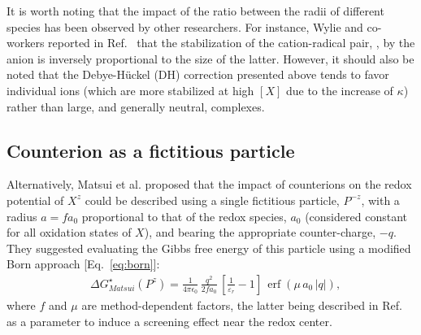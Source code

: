 \documentclass[review,preprint]{elsarticle}
\DeclareMathOperator{\erf}{erf}
\begin{document}
It is worth noting that the impact of the ratio between the radii of different species has been observed by other researchers. For instance, Wylie and co-workers reported in Ref.~ that the stabilization of the cation-radical pair, , by the anion is inversely proportional to the size of the latter. However, it should also be noted that the Debye-Hückel (DH) correction presented above tends to favor individual ions (which are more stabilized at high $[X]$ due to the increase of $\kappa$) rather than large, and generally neutral, complexes.


\subsection{Counterion as a fictitious particle}

Alternatively, Matsui et al. \cite{matsuiDensityFunctionalTheory2013} proposed that the impact of counterions on the redox potential of $X^z$ could be described using a single fictitious particle, $P^{-z}$, with a radius $a=fa_0$ proportional to that of the redox species, $a_0$ (considered constant for all oxidation states of $X$), and bearing the appropriate counter-charge, $-q$. They suggested evaluating the Gibbs free energy of this particle using a modified Born approach [Eq.~\eqref{eq:born}]:\begin{align}
	&\Delta G^\star_{Matsui}(P^z) = \frac{1}{4\pi\epsilon_0}\, \frac{q^2}{2fa_0}\,\left[\frac{1}{\varepsilon_r}-1\right]\,\erf(\mu\,a_0\,|q|),
\end{align}
where $f$ and $\mu$ are method-dependent factors, the latter being described in Ref.~ as a parameter to induce a screening effect near the redox center.
\end{document}
